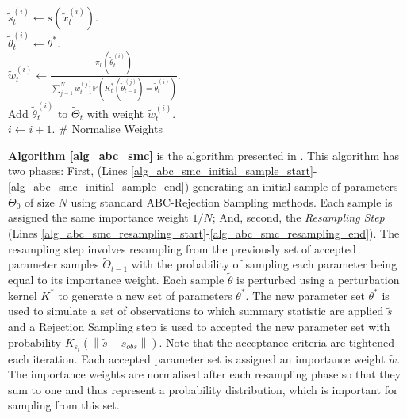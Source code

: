 \documentclass[11pt,a4paper]{article}
\newcommand*{\prob}{\mathbb{P}}
\theoremstyle{break}
\begin{document}
\begin{box_algorithm}
\begin{algorithm}[H]
{{          $\tilde{s}_t^{(i)}\leftarrow s\left(\tilde{x}_t^{(i)}\right)$.\\
           {
            $\tilde\theta_t^{(i)}\leftarrow\theta^*$.\\
            $\tilde{w}_t^{(i)}\leftarrow\frac{\pi_0\left(\tilde\theta_t^{(i)}\right)}{\sum_{j=1}^Nw_{t-1}^{(j)}\prob\left(K_t^*\left(\tilde\theta_{t-1}^{(j)}\right)=\tilde\theta_{t}^{(i)}\right)}$.\label{alg_abc_smc_importance_weight}\\
            Add $\tilde\theta_t^{(i)}$ to $\tilde\Theta_t$ with weight $\tilde{w}_t^{(i)}$.\\
            $i\leftarrow i+1$.
          } 
        }
        \BlankLine
        \# Normalise Weights\\
      }\label{alg_abc_smc_resampling_end}
    \end{algorithm}
  \end{box_algorithm}

  \par \textbf{Algorithm \ref{alg_abc_smc}} is the algorithm presented in \cite[]{adaptive_ABC}. This algorithm has two phases: First, (Lines \ref{alg_abc_smc_initial_sample_start}-\ref{alg_abc_smc_initial_sample_end}) generating an initial sample of parameters $\tilde\Theta_0$ of size $N$ using standard ABC-Rejection Sampling methods. Each sample is assigned the same importance weight $1/N$; And, second, the \textit{Resampling Step} (Lines \ref{alg_abc_smc_resampling_start}-\ref{alg_abc_smc_resampling_end}). The resampling step involves resampling from the previously set of accepted parameter samples $\tilde\Theta_{t-1}$ with the probability of sampling each parameter being equal to its importance weight. Each sample $\tilde\theta$ is perturbed using a perturbation kernel $K^*$ to generate a new set of parameters $\theta^*$. The new parameter set $\theta^*$ is used to simulate a set of observations to which summary statistic are applied $\tilde{s}$ and a Rejection Sampling step is used to accepted the new parameter set with probability $K_{\varepsilon_t}\left(\left\|\tilde{s}-s_{obs}\right\|\right)$. Note that the acceptance criteria are tightened each iteration. Each accepted parameter set is assigned an importance weight $\tilde{w}$. The importance weights are normalised after each resampling phase so that they sum to one and thus represent a probability distribution, which is important for sampling from this set.
\end{document}
